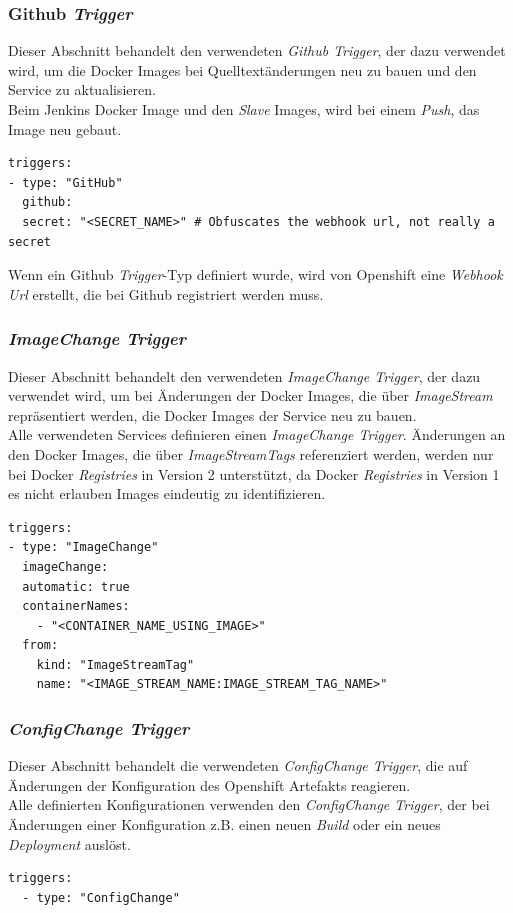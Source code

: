\pagebreak

\subsubsection{Github \emph{Trigger}}
Dieser Abschnitt behandelt den verwendeten \emph{Github Trigger}, der dazu verwendet wird, um die Docker Images bei Quelltextänderungen neu zu bauen und den Service zu aktualisieren.\\

Beim Jenkins Docker Image und den \emph{Slave} Images, wird bei einem \emph{Push}, das Image neu gebaut.

\begin{verbatim}
triggers:
- type: "GitHub"
  github:
  secret: "<SECRET_NAME>" # Obfuscates the webhook url, not really a secret
\end{verbatim}
Wenn ein Github \emph{Trigger}-Typ definiert wurde, wird von Openshift eine \emph{Webhook Url} erstellt, die bei Github registriert werden muss.

\subsubsection{\emph{ImageChange Trigger}}
Dieser Abschnitt behandelt den verwendeten \emph{ImageChange Trigger}, der dazu verwendet wird, um bei Änderungen der Docker Images, die über \emph{ImageStream} repräsentiert werden, die Docker Images der Service neu zu bauen.\\

Alle verwendeten Services definieren einen \emph{ImageChange Trigger}. Änderungen an den Docker Images, die über \emph{ImageStreamTags} referenziert werden, werden nur bei Docker \emph{Registries} in Version 2 unterstützt, da Docker \emph{Registries} in Version 1 es nicht erlauben Images eindeutig zu identifizieren.
\begin{verbatim}
triggers:
- type: "ImageChange"
  imageChange:
  automatic: true
  containerNames:
    - "<CONTAINER_NAME_USING_IMAGE>" 
  from:
    kind: "ImageStreamTag"
    name: "<IMAGE_STREAM_NAME:IMAGE_STREAM_TAG_NAME>"
\end{verbatim}

\subsubsection{\emph{ConfigChange Trigger}}
Dieser Abschnitt behandelt die verwendeten \emph{ConfigChange Trigger}, die auf Änderungen der Konfiguration des Openshift Artefakts reagieren.\\

Alle definierten Konfigurationen verwenden den \emph{ConfigChange Trigger}, der bei Änderungen einer Konfiguration z.B. einen neuen \emph{Build} oder ein neues \emph{Deployment} auslöst.
\begin{verbatim}
triggers:
  - type: "ConfigChange"
\end{verbatim}
